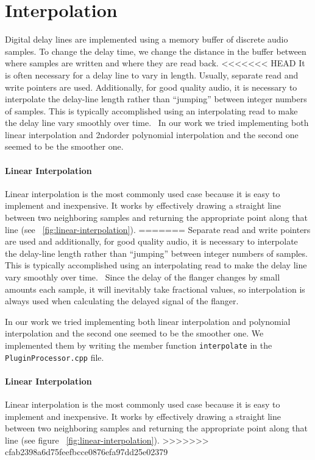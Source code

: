 \section{Interpolation}

Digital delay lines are implemented using a memory buffer of discrete audio samples. To change the delay time, we change the distance in the buffer between where samples are written and where they are read back.\cite{reiss2014audio}
<<<<<<< HEAD
It is often necessary for a delay line to vary in length. Usually, separate read and write pointers are used. Additionally, for good quality audio, it is necessary to interpolate the delay-line length rather than ``jumping'' between integer numbers of samples. This is typically accomplished using an interpolating read to make the delay line vary smoothly over time.~\cite{smith2010physical}
In our work we tried implementing both linear interpolation and 2ndorder polynomial interpolation and the second one seemed to be the smoother one.

\paragraph{Linear Interpolation}
Linear interpolation is the most commonly used case because it is easy to implement and inexpensive.
It works by effectively drawing a straight line between two neighboring samples and returning the appropriate point along that line (see ~\ref{fig:linear-interpolation}).
=======
Separate read and write pointers are used and additionally, for good quality audio, it is necessary to interpolate the delay-line length rather than ``jumping'' between integer numbers of samples. This is typically accomplished using an interpolating read to make the delay line vary smoothly over time.~\cite{smith2010physical}
Since the delay of the flanger changes by small amounts each sample, it will inevitably take fractional values, so interpolation is always used when calculating the delayed signal of the flanger.

In our work we tried implementing both linear interpolation and polynomial interpolation and the second one seemed to be the smoother one.
We implemented them by writing the member function \texttt{interpolate} in the \texttt{PluginProcessor.cpp} file.


\paragraph{Linear Interpolation}
Linear interpolation is the most commonly used case because it is easy to implement and inexpensive.
It works by effectively drawing a straight line between two neighboring samples and returning the appropriate point along that line (see figure ~\ref{fig:linear-interpolation}).
>>>>>>> cfab2398a6d75feefbcce0876efa97dd25e02379
  
